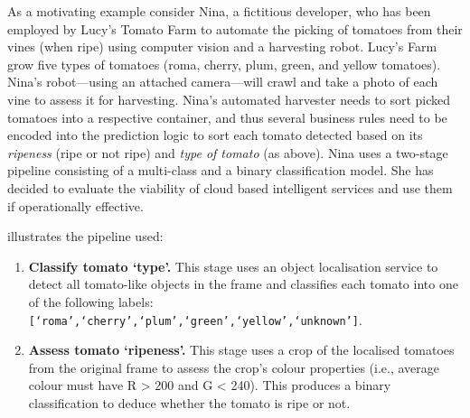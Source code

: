 As a motivating example consider Nina, a fictitious developer, who has been employed by Lucy's Tomato Farm to automate the picking of tomatoes from their vines (when ripe) using computer vision and a harvesting robot. Lucy's Farm grow five types of tomatoes (roma, cherry, plum, green, and yellow tomatoes). Nina's robot---using an attached camera---will crawl and take a photo of each vine to assess it for harvesting.
Nina's automated harvester needs to sort picked tomatoes into a respective container, and thus several business rules need to be encoded into the prediction logic to sort each tomato detected based on its \textit{ripeness} (ripe or not ripe) and \textit{type of tomato} (as above).
Nina uses a two-stage pipeline consisting of a multi-class and a binary classification model. She has decided to evaluate the viability of cloud based intelligent services and use them if operationally effective.

 illustrates the pipeline used:

 \begin{enumerate}
    \item \textbf{Classify tomato `type'.} This stage uses an object localisation service to detect all tomato-like objects in the frame and classifies each tomato into one of the following labels: \texttt{[`roma',`cherry',`plum',`green',`yellow',`unknown']}.
    \item \textbf{Assess tomato `ripeness'.} This stage uses a crop of the localised tomatoes from the original frame to assess the crop's colour properties (i.e., average colour must have R > 200 and G < 240). This produces a binary classification to deduce whether the tomato is ripe or not.
\end{enumerate}

